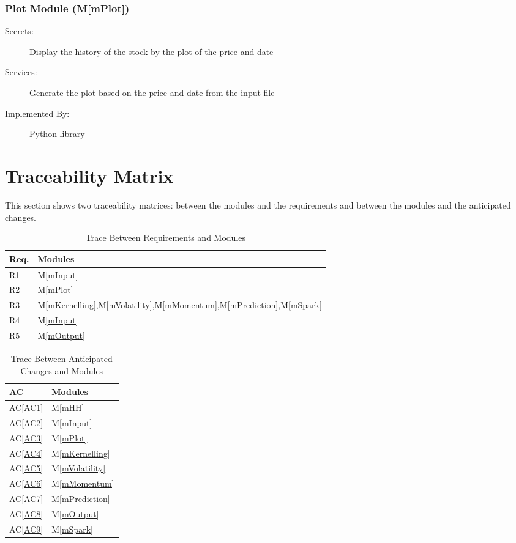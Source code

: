 \documentclass[12pt, titlepage]{article}
\newcommand{\acref}[1]{AC\ref{#1}}
\newcommand{\mref}[1]{M\ref{#1}}
\begin{document}
\subsubsection{Plot Module (\mref{mPlot})}
\begin{description}
\item[Secrets:] Display the history of the stock by the plot of the price and date
\item[Services:] Generate the plot based on the price and date from the input file
\item[Implemented By:] Python library
\end{description}



\section{Traceability Matrix} \label{SecTM}

This section shows two traceability matrices: between the modules and the
requirements and between the modules and the anticipated changes.

\begin{table}[H]
\centering
\begin{tabular}{p{} p{}}
\toprule
\textbf{Req.} & \textbf{Modules}\\
\midrule
R1 & \mref{mInput}\\
R2 & \mref{mPlot}\\
R3 & \mref{mKernelling},\mref{mVolatility},\mref{mMomentum},\mref{mPrediction},\mref{mSpark}\\
R4 & \mref{mInput}\\
R5 & \mref{mOutput}\\

\bottomrule
\end{tabular}
\caption{Trace Between Requirements and Modules}
\label{TblRT}
\end{table}

\begin{table}[H]
\centering
\begin{tabular}{p{} p{}}
\toprule
\textbf{AC} & \textbf{Modules}\\
\midrule
\acref{AC1} & \mref{mHH}\\
\acref{AC2} & \mref{mInput}\\
\acref{AC3} & \mref{mPlot}\\
\acref{AC4} & \mref{mKernelling}\\
\acref{AC5} & \mref{mVolatility}\\
\acref{AC6} & \mref{mMomentum}\\
\acref{AC7} & \mref{mPrediction}\\
\acref{AC8} & \mref{mOutput}\\
\acref{AC9} & \mref{mSpark}\\

\bottomrule
\end{tabular}
\caption{Trace Between Anticipated Changes and Modules}
\label{TblACT}
\end{table}
\end{document}
